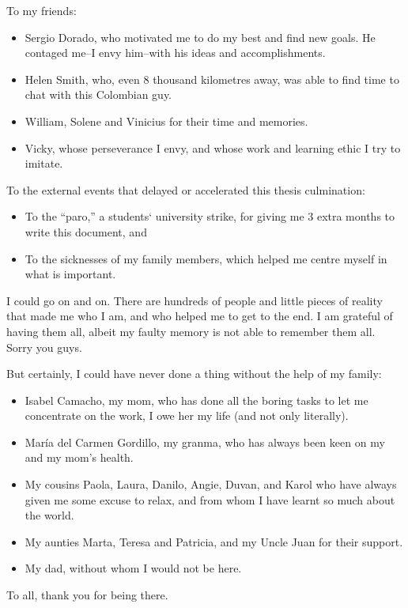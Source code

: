 \begin{acknowledgements}
To my friends:

\begin{itemize}
\tightlist
\item Sergio Dorado, who motivated me to do my best and find new goals. He contaged me--I
  envy him--with his ideas and accomplishments.
\item Helen Smith, who, even 8 thousand kilometres away, was able to find time to chat
  with this Colombian guy.
\item William, Solene and Vinicius for their time and memories.
\item Vicky, whose perseverance I envy, and whose work and learning ethic I try to imitate.
\end{itemize}

To the external events that delayed or accelerated this thesis culmination:

\begin{itemize}
\tightlist
\item To the \enquote{paro,} a students` university strike, for giving me 3 extra months to
  write this document,  and
\item To the sicknesses of my family members, which helped me centre myself in what is
  important.
\end{itemize}

I could go on and on. There are hundreds of people and little pieces of
reality that made me who I am, and who helped me to get to the end. I am
grateful of having them all, albeit my faulty memory is not able to remember them all.
Sorry you guys.

But certainly, I could have never done a thing without the help of my
family:

\begin{itemize}
\tightlist
\item Isabel Camacho, my mom, who has done all the boring tasks to let me concentrate
  on the work, I owe her my life (and not only literally).
\item María del Carmen Gordillo, my granma, who has always been keen on my and my
  mom's health.
\item My cousins Paola, Laura, Danilo, Angie, Duvan, and Karol who have always given me
  some excuse to relax, and from whom I have learnt so much about the world.
\item My aunties Marta, Teresa and Patricia, and my Uncle Juan for their support.
\item My dad, without whom I would not be here.
\end{itemize}

To all, thank you for being there.

\end{acknowledgements}

